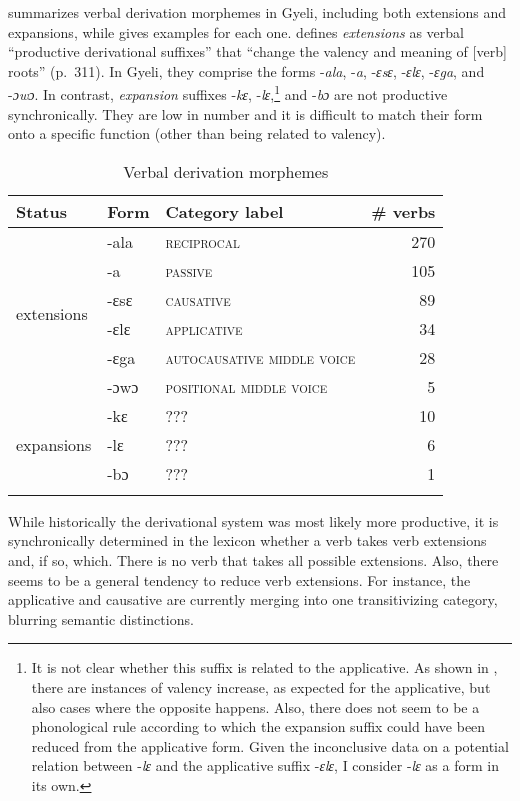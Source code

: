  summarizes verbal derivation morphemes in Gyeli, including both extensions and expansions, while  gives examples for each one. \citet{nurse08} defines {\itshape extensions} as verbal ``productive derivational suffixes'' that ``change the valency and meaning of [verb] roots'' (p.\ 311). In Gyeli, they comprise the forms -{\itshape ala}, -{\itshape a}, -{\itshape ɛsɛ}, -{\itshape ɛlɛ}, -{\itshape ɛga}, and -{\itshape ɔwɔ}. In contrast, {\itshape expansion} suffixes -{\itshape kɛ}, -{\itshape lɛ},\footnote{It is not clear whether this suffix is related to the applicative. As shown in , there are instances of valency increase, as expected for the applicative, but also cases where the opposite happens. Also, there does not seem to be a phonological rule according to which the expansion suffix could have been reduced from the applicative form. Given the inconclusive data on a potential relation between -{\itshape lɛ} and the applicative suffix -{\itshape ɛlɛ}, I consider -{\itshape lɛ} as a form in its own.} and -{\itshape bɔ} are not productive synchronically. They are low in number and it is difficult to match their form onto a specific function (other than being related to valency).


\begin{table}
\begin{tabular}{lllr}
\lsptoprule
Status & Form & Category label & \# verbs \\  \midrule
\multirow{6}{*}{extensions} & -ala & {\scshape reciprocal} & 270  \\
& -a & {\scshape passive} & 105 \\
& -ɛsɛ & {\scshape causative} & 89 \\
& -ɛlɛ & {\scshape applicative} & 34 \\
& -ɛga & {\scshape autocausative middle voice} & 28  \\
& -ɔwɔ & {\scshape positional middle voice} & 5 \\  \midrule
  & -kɛ & {\scshape ???} &  10 \\
{expansions} &  -lɛ & {\scshape ???} & 6 \\
 & -bɔ & {\scshape ???} & 1  \\
 \lspbottomrule
\end{tabular}
\caption{Verbal derivation morphemes}
\label{Tab:SumVext}
\end{table} 


While historically the derivational system was most likely more productive, it is synchronically determined in the lexicon whether a verb takes verb extensions and, if so, which.  There is no verb that takes all possible extensions. Also, there seems to be a general tendency to reduce verb extensions. For instance, the applicative and causative are currently merging into one transitivizing category, blurring semantic distinctions. 

